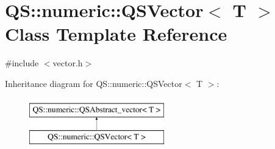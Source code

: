 \hypertarget{classQS_1_1numeric_1_1QSVector}{\section{Q\-S\-:\-:numeric\-:\-:Q\-S\-Vector$<$ T $>$ Class Template Reference}
\label{classQS_1_1numeric_1_1QSVector}
}


{\ttfamily \#include $<$vector.\-h$>$}

Inheritance diagram for Q\-S\-:\-:numeric\-:\-:Q\-S\-Vector$<$ T $>$\-:\begin{figure}[H]
\begin{center}
\leavevmode
\includegraphics[height=2.000000cm]{classQS_1_1numeric_1_1QSVector}
\end{center}
\end{figure}
